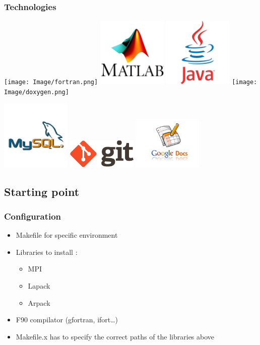 \documentclass[10p]{beamer}
\begin{document}
\begin{frame}
\frametitle{Technologies}
\texttt{[image: Image/fortran.png]}
\includegraphics[width=0.25\textwidth]{Image/matlab.png}
\includegraphics[width=0.25\textwidth]{Image/java.png}
\texttt{[image: Image/doxygen.png]}\\
\begin{center}
\includegraphics[width=0.25\textwidth]{Image/mysql.png}
\includegraphics[width=0.25\textwidth]{Image/git.png}
\includegraphics[width=0.25\textwidth]{Image/GoogleDocs1.png}
\end{center}
\end{frame}
\subsection{Starting point}
\begin{frame}
\frametitle{Configuration}
\begin{itemize}
\item Makefile for specific environment
\item Libraries to install :
\begin{itemize}
\item MPI
\item Lapack
\item Arpack
\end{itemize}
\item F90 compilator (gfortran, ifort…)
\item Makefile.x has to specify the correct paths of the libraries above
\end{itemize}
\end{frame}
\end{document}
